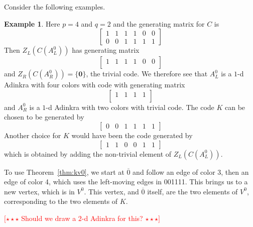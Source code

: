 \documentclass[12pt,twoside,singlespace]{article}
\numberwithin{equation}{section}
\theoremstyle{definition}
\newtheorem{ex}[equation]{Example}
\newcommand{\com}[1]{\textcolor{red}{$[\star \star \star$ #1 $\star \star \star]$}}
\renewcommand{\vec}[1]{\mathbf{#1}}
\begin{document}
Consider the following examples.
\begin{ex}
Here $p=4$ and $q=2$ and the generating matrix for $C$ is
\[\left[\begin{array}{cccc|cc}
1&1&1&1&0&0\\
0&0&1&1&1&1
\end{array}\right]\]
Then $Z_L(C(A_L^0))$ has generating matrix
\[\left[\begin{array}{cccc|cc}
1&1&1&1&0&0\\
\end{array}\right]\]
and $Z_R(C(A_R^0))=\{\vec{0}\}$, the trivial code.  We therefore see that $A_L^0$ is a $1$-d Adinkra with four colors with code with generating matrix
\[\left[\begin{array}{cccc}
1&1&1&1\\
\end{array}\right]\]
and $A_R^0$ is a $1$-d Adinkra with two colors with trivial code.  The code $K$ can be chosen to be generated by
\[\left[\begin{array}{cccc|cc}
0&0&1&1&1&1
\end{array}\right]\]
Another choice for $K$ would have been the code generated by
\[\left[\begin{array}{cccc|cc}
1&1&0&0&1&1
\end{array}\right]\]
which is obtained by adding the non-trivial element of $Z_L(C(A_L^0))$.

To use Theorem~\ref{thm:kv0}, we start at $\overline{0}$ and follow an edge of color 3, then an edge of color 4, which uses the left-moving edges in 001111.  This brings us to a new vertex, which is in $V^0$.  This vertex, and $\overline{0}$ itself, are the two elements of $V^0$, corresponding to the two elements of $K$.

\com{Should we draw a $2$-d Adinkra for this?}
\end{ex}
\end{document}
